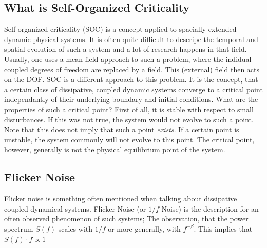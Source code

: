 \documentclass[11pt]{article}
\begin{document}
\subsection{What is Self-Organized Criticality}
Self-organized criticality (SOC) is a concept applied to spacially extended dynamic physical systems. It is often quite difficult to descripe the temporal and spatial evolution of such a system and a lot of research happens in that field. Usually, one uses a mean-field approach to such a problem, where the indidual coupled degrees of freedom are replaced by a field. This (external) field then acts on the DOF.  SOC is a different approach to this problem. It is the concept, that a certain class of dissipative, coupled dynamic systems converge to a critical point independantly of their underlying boundary and initial conditions. 
What are the properties of such a critical point? First of all, it is stable with respect to small disturbances. If this was not true, the system would not evolve to such a point. Note that this does not imply that such a point \emph{exists}. If a certain point is unstable, the system commonly will not evolve to this point. The critical point, however, generally is not the physical equilibrium point of the system.

\subsection{Flicker Noise}
Flicker noise is something often mentioned when talking about dissipative coupled dynamical systems. Flicker Noise (or $1/f$-Noise) is the description for an often observed phenomenon of such systems; The observation, that the power spectrum $S(f)$ scales with $1/f$ or more generally, with $f^{-\beta}$. This implies that $S(f)\cdot f \varpropto 1$
\end{document}
